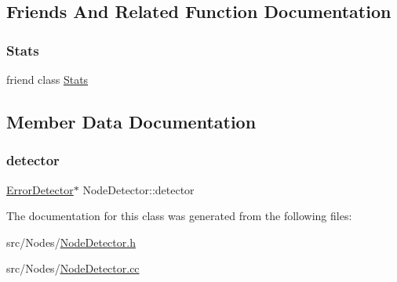 \subsection{Friends And Related Function Documentation}
\mbox{\label{class_node_detector_a129f65b6976377739eb6231b6962985e}} 
\subsubsection{\texorpdfstring{Stats}{Stats}}
{\footnotesize\ttfamily friend class \hyperlink{class_stats}{Stats}\hspace{0.3cm}{\ttfamily [friend]}}



\subsection{Member Data Documentation}
\mbox{\label{class_node_detector_a711fd643dc29b74e6dfe87e1aeb1b227}} 
\subsubsection{\texorpdfstring{detector}{detector}}
{\footnotesize\ttfamily \hyperlink{class_error_detector}{Error\+Detector}$\ast$ Node\+Detector\+::detector\hspace{0.3cm}{\ttfamily [protected]}}



The documentation for this class was generated from the following files\+:\begin{DoxyCompactItemize}
\item 
src/\+Nodes/\hyperlink{_node_detector_8h}{Node\+Detector.\+h}\item 
src/\+Nodes/\hyperlink{_node_detector_8cc}{Node\+Detector.\+cc}\end{DoxyCompactItemize}
